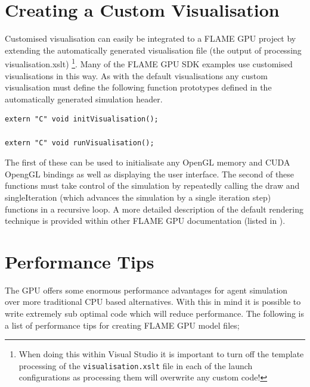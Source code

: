 \documentclass[11pt, a4paper, onecolumn, oneside]{report}
\begin{document}
\section{Creating a Custom Visualisation}
\label{sec:46}


Customised visualisation can easily be integrated to a FLAME GPU project by extending the automatically generated visualisation file (the output of processing visualisation.xslt)
\footnote{When doing this within Visual Studio it is important to turn off the template processing of the \texttt{visualisation.xslt} file in each of the launch configurations as processing them will overwrite any custom code!}.
Many of the FLAME GPU SDK examples use customised visualisations in this way.
As with the default visualisations any custom visualisation must define the following function prototypes defined in the automatically generated simulation header.

\begin{verbatim}
extern "C" void initVisualisation();

extern "C" void runVisualisation();
\end{verbatim}

The first of these can be used to initialisate any OpenGL memory and CUDA OpengGL bindings as well as displaying the user interface.
The second of these functions must take control of the simulation by repeatedly calling the draw and singleIteration (which advances the simulation by a single iteration step) functions in a recursive loop.
A more detailed description of the default rendering technique is provided within other FLAME GPU documentation (listed in ).

\section{Performance Tips}
\label{sec:47}


The GPU offers some enormous performance advantages for agent simulation over more traditional CPU based alternatives.
With this in mind it is possible to write extremely sub optimal code which will reduce performance.
The following is a list of performance tips for creating FLAME GPU model files;
\end{document}
